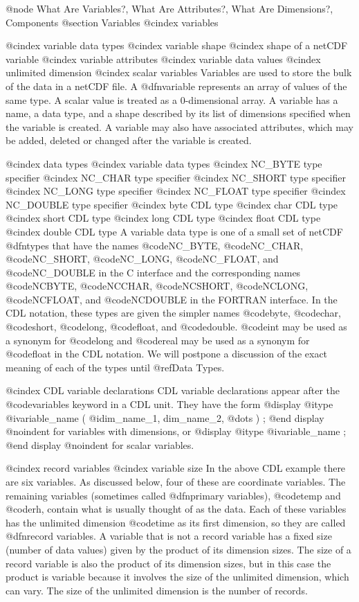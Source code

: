 @node What Are Variables?, What Are Attributes?, What Are Dimensions?, Components
@section Variables
@cindex variables

@cindex variable data types
@cindex variable shape
@cindex shape of a netCDF variable
@cindex variable attributes
@cindex variable data values
@cindex unlimited dimension
@cindex scalar variables
Variables are used to store the bulk of the data in a netCDF file.
A @dfn{variable} represents an array of values of the same type.
A scalar value is treated as a 0-dimensional array.
A variable has a name, a data type, and a shape described by
its list of dimensions specified when the variable is created.
A variable may also have associated
attributes, which may be added, deleted
or changed after the variable is created.

@cindex data types
@cindex variable data types
@cindex NC_BYTE type specifier
@cindex NC_CHAR type specifier
@cindex NC_SHORT type specifier
@cindex NC_LONG type specifier
@cindex NC_FLOAT type specifier
@cindex NC_DOUBLE type specifier
@cindex byte CDL type
@cindex char CDL type
@cindex short CDL type
@cindex long CDL type
@cindex float CDL type
@cindex double CDL type
A variable data type is one of a small set of netCDF @dfn{types} that
have the names @code{NC_BYTE}, @code{NC_CHAR}, @code{NC_SHORT},
@code{NC_LONG}, @code{NC_FLOAT}, and @code{NC_DOUBLE} in the C interface
and the corresponding names @code{NCBYTE}, @code{NCCHAR}, @code{NCSHORT},
@code{NCLONG}, @code{NCFLOAT}, and @code{NCDOUBLE} in the
FORTRAN interface.  In the CDL notation, these types are given the
simpler names @code{byte}, @code{char}, @code{short}, @code{long},
@code{float}, and @code{double}.  @code{int} may be used as a synonym
for @code{long} and @code{real} may be used as a synonym for
@code{float} in the CDL notation.  We will postpone a discussion of the
exact meaning of each of the types until
@ref{Data Types}.

@cindex CDL variable declarations
CDL variable declarations appear after the @code{variables} keyword in
a CDL unit.  They have the form
@display
     @i{type} @i{variable_name}  ( @i{dim_name_1, dim_name_2, @dots{}} ) ;
@end display
@noindent
for variables with dimensions, or
@display
     @i{type} @i{variable_name} ;
@end display
@noindent
for scalar variables.

@cindex record variables
@cindex variable size
In the above CDL example there are six variables.  As discussed below, four of
these are coordinate variables.
The remaining variables (sometimes called @dfn{primary variables}),
@code{temp} and @code{rh}, contain what is usually thought of as the
data.  Each of these variables has the unlimited dimension @code{time}
as its first dimension, so they are called @dfn{record variables}.  A
variable that is not a record variable has a fixed size (number of data
values) given by the product of its dimension sizes.
The size of a record variable is also the product of its dimension sizes,
but in this case the product is variable because it involves
the size of the unlimited dimension, which can vary.
The size of the unlimited dimension is the number of records.

